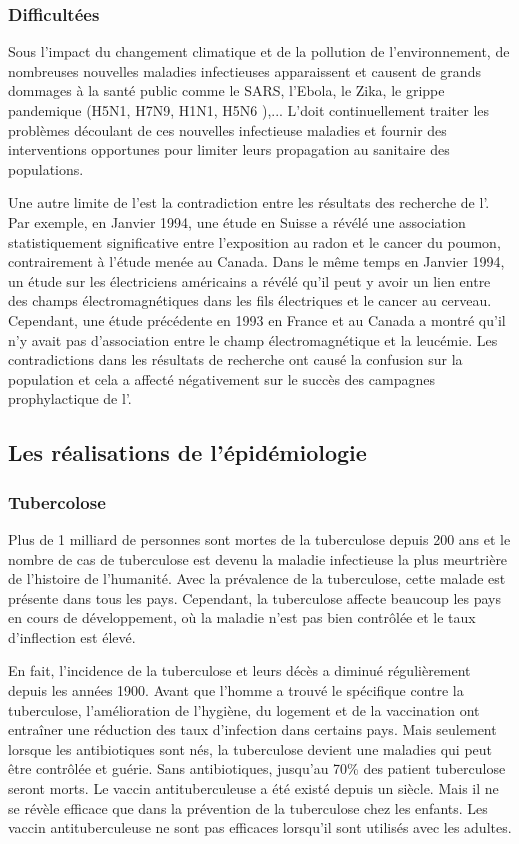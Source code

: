 \subsubsection{Difficultées}
Sous l'impact du changement climatique et de la pollution de l'environnement, de nombreuses nouvelles maladies infectieuses apparaissent et causent de grands dommages à la santé public comme le SARS, l'Ebola, le Zika, le grippe pandemique (H5N1, H7N9, H1N1, H5N6 ),... L'\ep doit continuellement traiter les problèmes découlant de ces nouvelles infectieuse maladies et fournir des interventions opportunes pour limiter leurs propagation au sanitaire des populations. 

Une autre limite de l'\ep est la contradiction entre les résultats des recherche de l'\ep. Par exemple, en Janvier 1994, une étude en Suisse a révélé une association statistiquement significative entre l'exposition au radon et le cancer du poumon, contrairement à l'étude menée au Canada. Dans le même temps en Janvier 1994, un étude sur les électriciens américains a révélé qu'il peut y avoir un lien entre des champs électromagnétiques dans les fils électriques et le cancer au cerveau. Cependant, une étude précédente en 1993 en France et au Canada a montré qu'il n'y avait pas d'association entre le champ électromagnétique et la leucémie. Les contradictions dans les résultats de recherche ont causé la confusion sur la population et cela a affecté négativement sur le succès des campagnes prophylactique de l'\ep.

\subsection{Les réalisations de l'épidémiologie}
\subsubsection{Tubercolose}
Plus de 1 milliard de personnes sont mortes de la tuberculose depuis 200 ans et le nombre de cas de tuberculose est devenu la maladie infectieuse la plus meurtrière de l'histoire de l'humanité. Avec la prévalence de la tuberculose, cette malade est présente dans tous les pays. Cependant, la tuberculose affecte beaucoup les pays en cours de développement, où la maladie n'est pas bien contrôlée et le taux d'inflection est élevé.

En fait, l'incidence de la tuberculose et leurs décès a diminué régulièrement depuis les années 1900. Avant que l'homme a trouvé le spécifique contre la tuberculose, l'amélioration de l'hygiène, du logement et de la vaccination ont entraîner une réduction des taux d'infection dans certains pays. Mais seulement lorsque les antibiotiques sont nés, la tuberculose devient une maladies qui peut être contrôlée et guérie. Sans antibiotiques, jusqu'au 70\% des patient tuberculose seront morts. Le vaccin antituberculeuse a été existé depuis un siècle. Mais il ne se révèle efficace que dans la prévention de la tuberculose chez les enfants. Les vaccin antituberculeuse ne sont pas efficaces lorsqu'il sont utilisés avec les adultes.

